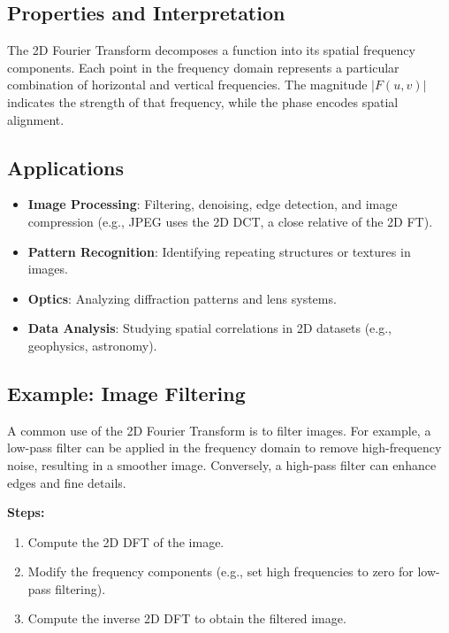 \documentclass[11pt,a4paper]{article}
\begin{document}
\subsection{Properties and Interpretation}

The 2D Fourier Transform decomposes a function into its spatial frequency components. Each point in the frequency domain represents a particular combination of horizontal and vertical frequencies. The magnitude $|F(u, v)|$ indicates the strength of that frequency, while the phase encodes spatial alignment.

\subsection{Applications}

\begin{itemize}
    \item \textbf{Image Processing}: Filtering, denoising, edge detection, and image compression (e.g., JPEG uses the 2D DCT, a close relative of the 2D FT).
    \item \textbf{Pattern Recognition}: Identifying repeating structures or textures in images.
    \item \textbf{Optics}: Analyzing diffraction patterns and lens systems.
    \item \textbf{Data Analysis}: Studying spatial correlations in 2D datasets (e.g., geophysics, astronomy).
\end{itemize}

\subsection{Example: Image Filtering}

A common use of the 2D Fourier Transform is to filter images. For example, a low-pass filter can be applied in the frequency domain to remove high-frequency noise, resulting in a smoother image. Conversely, a high-pass filter can enhance edges and fine details.

\textbf{Steps:}
\begin{enumerate}
    \item Compute the 2D DFT of the image.
    \item Modify the frequency components (e.g., set high frequencies to zero for low-pass filtering).
    \item Compute the inverse 2D DFT to obtain the filtered image.
\end{enumerate}
\end{document}

